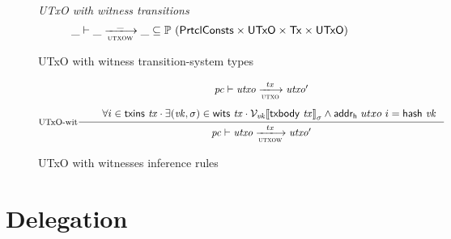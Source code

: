 \documentclass[11pt,a4paper]{article}
\newcommand{\Tx}{\type{Tx}}
\newcommand{\UTxO}{\type{UTxO}}
\newcommand{\PrtclConsts}{\type{PrtclConsts}}
\newcommand{\txins}[1]{\fun{txins}~ \var{#1}}
\newcommand{\wits}[1]{\fun{wits}~ \var{#1}}
\newcommand{\serialised}[1]{\llbracket \var{#1} \rrbracket}
\newcommand{\hash}[1]{\fun{hash}~ \var{#1}}
\newcommand{\txbody}[1]{\fun{txbody}~ \var{#1}}
\begin{document}
\begin{figure}
  \emph{UTxO with witness transitions}
  \begin{equation*}
    \var{\_} \vdash
    \var{\_} \trans{utxow}{\_} \var{\_}
    \subseteq \powerset (\PrtclConsts \times \UTxO \times \Tx \times \UTxO)
  \end{equation*}
  \caption{UTxO with witness transition-system types}
  \label{fig:ts-types:utxow}
\end{figure}

\begin{figure}
  \begin{equation}
    \label{eq:utxo-witness-inductive}
    \inference[UTxO-wit]
    { \var{pc} \vdash \var{utxo} \trans{utxo}{tx} \var{utxo'}\\ ~ \\
      & \forall i \in \txins{tx} \cdot \exists (\var{vk}, \sigma) \in \wits{\var{tx}}
      \cdot
      \mathcal{V}_{\var{vk}}{\serialised{\txbody{tx}}}_{\sigma}
      \wedge  \fun{addr_h}~{utxo}~i = \hash{vk}\\
    }
    {\var{pc} \vdash \var{utxo} \trans{utxow}{tx} \var{utxo'}}
  \end{equation}
  \caption{UTxO with witnesses inference rules}
  \label{fig:rules:utxow}
\end{figure}

\section{Delegation}
\label{sec:delegation}




\end{document}
